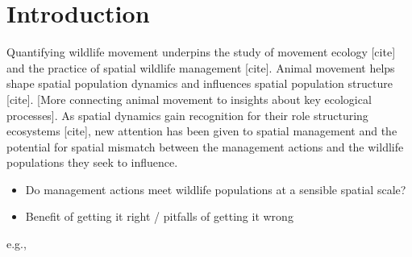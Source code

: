 \documentclass{article}
\begin{document}
\section{Introduction}


Quantifying wildlife movement underpins the study of movement ecology [cite] and the practice of spatial wildlife management [cite]. Animal movement helps shape spatial population dynamics \cite[][]{morales2010} and influences spatial population structure [cite]. [More connecting animal movement to insights about key ecological processes]. As spatial dynamics gain recognition for their role structuring ecosystems [cite], new attention has been given to spatial management and the potential for spatial mismatch between the management actions and the wildlife populations they seek to influence.
\begin{itemize}
\item Do management actions meet wildlife populations at a sensible spatial scale?
\item Benefit of getting it right / pitfalls of getting it wrong %
\end{itemize}
e.g., 
\end{document}
